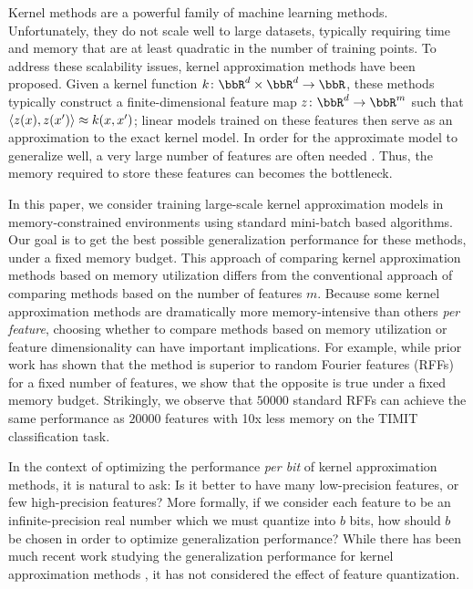 
Kernel methods are a powerful family of machine learning methods.  Unfortunately, they do not scale well to large datasets, typically requiring time and memory that are at least quadratic in the number of training points. To address these scalability issues, kernel approximation methods have been proposed. Given a kernel function $k\colon\RR^d\times\RR^d\rightarrow \RR$, these methods typically construct a finite-dimensional feature map $z\colon \RR^d \rightarrow \RR^m$ such that $\langle z(x),z(x') \rangle \approx k(x,x')$; linear models trained on these features then serve as an approximation to the exact kernel model. In order for the approximate model to generalize well, a very large number of features are often needed \citep{rahimi08kitchen,block16,may2017}. Thus, the memory required to store these features can becomes the bottleneck.

In this paper, we consider training large-scale kernel approximation models in memory-constrained environments using standard mini-batch based algorithms. Our goal is to get the best possible generalization performance for these methods, under a fixed memory budget. This approach of comparing kernel approximation methods based on memory utilization differs from the conventional approach of comparing methods based on the number of features $m$. Because some kernel approximation methods are dramatically more memory-intensive than others \textit{per feature}, choosing whether to compare methods based on memory utilization or feature dimensionality can have important implications. For example, while prior work \citep{nysvsrff12} has shown that the \Nystrom method \citep{nystrom} is superior to random Fourier features (RFFs) \citep{rahimi07random} for a fixed number of features, we show that the opposite is true under a fixed memory budget. Strikingly, we observe that $\num[group-separator={,}]{50000}$ standard RFFs can achieve the same performance as $\num[group-separator={,}]{20000}$ \Nystrom features with 10x less memory on the TIMIT classification task.

In the context of optimizing the performance \textit{per bit} of kernel approximation methods, it is natural to ask: Is it better to have many low-precision features, or few high-precision features? More formally, if we consider each feature to be an infinite-precision real number which we must quantize into $b$ bits, how should $b$ be chosen in order to optimize generalization performance? While there has been much recent work studying the generalization performance for kernel approximation methods \citep{rudi17,avron17,musco17,bach17}, it has not considered the effect of feature quantization.

